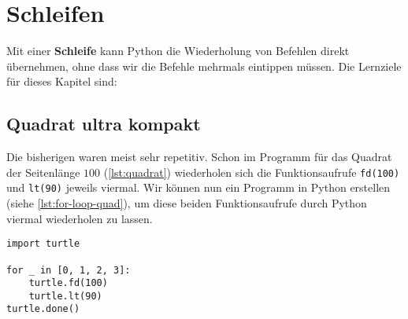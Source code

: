 
\toggletrue{image}
\toggletrue{imagehover}


\chapter{Schleifen}
\label{ch:schleifen}

Mit einer \textbf{Schleife} kann Python die Wiederholung von Befehlen direkt übernehmen, ohne dass wir die Befehle mehrmals eintippen müssen. Die Lernziele für dieses Kapitel sind:\\


\section{Quadrat ultra kompakt}
\label{sec:quadrat-ultra-kompakt}

Die bisherigen  waren meist sehr repetitiv. Schon im Programm für das Quadrat der Seitenlänge $100$ (\autoref{lst:quadrat}) wiederholen sich die Funktionsaufrufe \lstinline[language={python3}]{fd(100)} und \lstinline[language={python3}]{lt(90)} jeweils viermal. Wir können nun ein Programm in Python erstellen (siehe \autoref{lst:for-loop-quad}), um diese beiden Funktionsaufrufe durch Python viermal wiederholen zu lassen.

\begin{lstlisting}[language={python3}, caption={Die Zeilen \num{4} und \num{5} werden jeweils viermal ausgeführt (\graybgtexttt{quadrat\_loop.py}).}, label={lst:for-loop-quad}, lineskip={4.0pt}]
import turtle

for _ in [0, 1, 2, 3]:
	turtle.fd(100)
	turtle.lt(90)
turtle.done()

\end{lstlisting}

